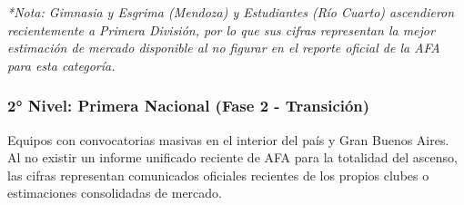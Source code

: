 \textit{*Nota: Gimnasia y Esgrima (Mendoza) y Estudiantes (Río Cuarto) ascendieron recientemente a Primera División, por lo que sus cifras representan la mejor estimación de mercado disponible al no figurar en el reporte oficial de la AFA para esta categoría.}

\newpage

\subsubsection{2° Nivel: Primera Nacional (Fase 2 - Transición)}

Equipos con convocatorias masivas en el interior del país y Gran Buenos Aires. Al no existir un informe unificado reciente de AFA para la totalidad del ascenso, las cifras representan comunicados oficiales recientes de los propios clubes o estimaciones consolidadas de mercado.

